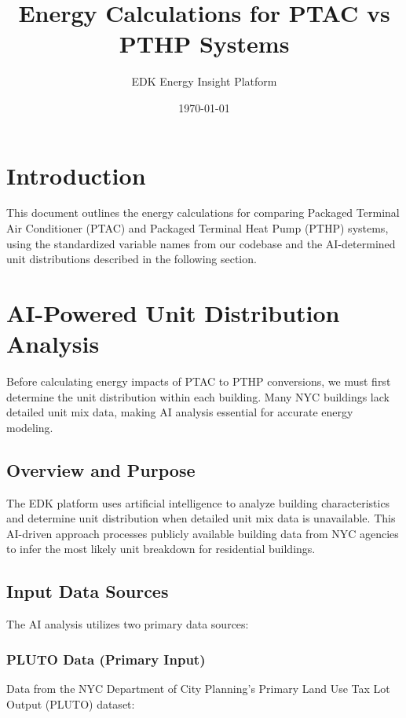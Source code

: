 \documentclass{article}
\title{Energy Calculations for PTAC vs PTHP Systems}
\author{EDK Energy Insight Platform}
\date{\today}
\begin{document}
\maketitle

\tableofcontents
\newpage

\section{Introduction}

This document outlines the energy calculations for comparing Packaged Terminal Air Conditioner (PTAC) and Packaged Terminal Heat Pump (PTHP) systems, using the standardized variable names from our codebase and the AI-determined unit distributions described in the following section.

\section{AI-Powered Unit Distribution Analysis}

Before calculating energy impacts of PTAC to PTHP conversions, we must first determine the unit distribution within each building. Many NYC buildings lack detailed unit mix data, making AI analysis essential for accurate energy modeling.

\subsection{Overview and Purpose}

The EDK platform uses artificial intelligence to analyze building characteristics and determine unit distribution when detailed unit mix data is unavailable. This AI-driven approach processes publicly available building data from NYC agencies to infer the most likely unit breakdown for residential buildings.

\subsection{Input Data Sources}

The AI analysis utilizes two primary data sources:

\subsubsection{PLUTO Data (Primary Input)}

Data from the NYC Department of City Planning's Primary Land Use Tax Lot Output (PLUTO) dataset:
\end{document}
